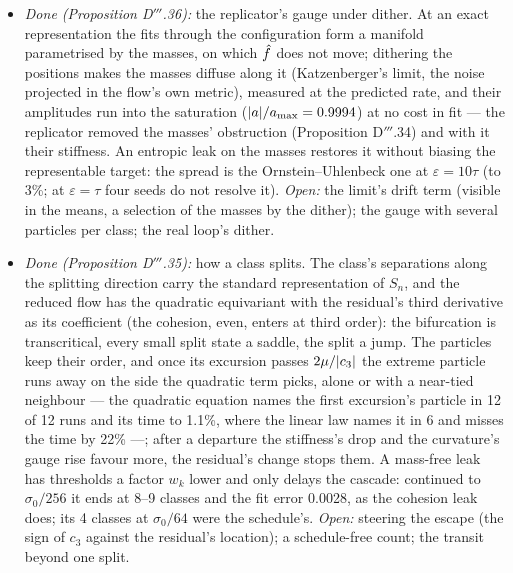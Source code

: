\begin{enumerate}[label=\arabic*.,leftmargin=*]
\begin{itemize}
      \emph{Open:} the stationary law of the masses; several particles per class at finite $\gamma$; whether a leak
      in the amplitudes (not the masses) removes the selection; the real loop.
    \item \emph{Done (Proposition D$'''$.36):} the replicator's gauge under dither. At an exact representation the
      fits through the configuration form a manifold parametrised by the masses, on which $\hat f$ does not move;
      dithering the positions makes the masses diffuse along it (Katzenberger's limit, the noise projected in the
      flow's own metric), measured at the predicted rate, and their amplitudes run into the saturation
      ($\lvert a\rvert/a_{\max} = 0.9994$) at no cost in fit --- the replicator removed the masses' obstruction (Proposition
      D$'''$.34) and with it their stiffness. An entropic leak on the masses restores it without biasing the
      representable target: the spread is the Ornstein--Uhlenbeck one at $\varepsilon = 10\tau$ (to 3\%; at
      $\varepsilon = \tau$ four seeds do not resolve it). \emph{Open:} the limit's drift term (visible in the means, a
      selection of the masses by the dither); the gauge with several particles per class; the real loop's dither.
    \item \emph{Done (Proposition D$'''$.35):} how a class splits. The class's separations along the splitting
      direction carry the standard representation of $S_n$, and the reduced flow has the quadratic equivariant with
      the residual's third derivative as its coefficient (the cohesion, even, enters at third order): the bifurcation
      is transcritical, every small split state a saddle, the split a jump. The particles keep their order, and once
      its excursion passes $2\mu/\lvert c_3\rvert$ the extreme particle runs away on the side the quadratic term picks, alone
      or with a near-tied neighbour --- the quadratic equation names the first excursion's particle in 12 of 12 runs
      and its time to 1.1\%, where the linear law names it in 6 and misses the time by 22\% ---; after a departure the
      stiffness's drop and the curvature's gauge rise favour more, the residual's change stops them. A mass-free leak
      has thresholds a factor $w_k$ lower and only delays the cascade: continued to $\sigma_0/256$ it ends at 8--9
      classes and the fit error 0.0028, as the cohesion leak does; its 4 classes at $\sigma_0/64$ were the
      schedule's. \emph{Open:} steering the escape (the sign of $c_3$ against the residual's location); a
      schedule-free count; the transit beyond one split.

\end{itemize}
\end{enumerate}
